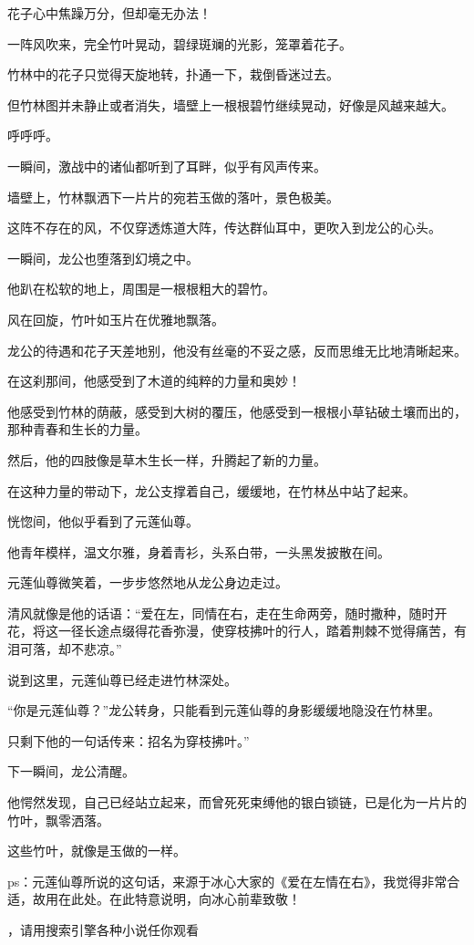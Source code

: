 \begin{this_body}
花子心中焦躁万分，但却毫无办法！

一阵风吹来，完全竹叶晃动，碧绿斑斓的光影，笼罩着花子。

竹林中的花子只觉得天旋地转，扑通一下，栽倒昏迷过去。

但竹林图并未静止或者消失，墙壁上一根根碧竹继续晃动，好像是风越来越大。

呼呼呼。

一瞬间，激战中的诸仙都听到了耳畔，似乎有风声传来。

墙壁上，竹林飘洒下一片片的宛若玉做的落叶，景色极美。

这阵不存在的风，不仅穿透炼道大阵，传达群仙耳中，更吹入到龙公的心头。

一瞬间，龙公也堕落到幻境之中。

他趴在松软的地上，周围是一根根粗大的碧竹。

风在回旋，竹叶如玉片在优雅地飘落。

龙公的待遇和花子天差地别，他没有丝毫的不妥之感，反而思维无比地清晰起来。

在这刹那间，他感受到了木道的纯粹的力量和奥妙！

他感受到竹林的荫蔽，感受到大树的覆压，他感受到一根根小草钻破土壤而出的，那种青春和生长的力量。

然后，他的四肢像是草木生长一样，升腾起了新的力量。

在这种力量的带动下，龙公支撑着自己，缓缓地，在竹林丛中站了起来。

恍惚间，他似乎看到了元莲仙尊。

他青年模样，温文尔雅，身着青衫，头系白带，一头黑发披散在间。

元莲仙尊微笑着，一步步悠然地从龙公身边走过。

清风就像是他的话语：“爱在左，同情在右，走在生命两旁，随时撒种，随时开花，将这一径长途点缀得花香弥漫，使穿枝拂叶的行人，踏着荆棘不觉得痛苦，有泪可落，却不悲凉。”

说到这里，元莲仙尊已经走进竹林深处。

“你是元莲仙尊？”龙公转身，只能看到元莲仙尊的身影缓缓地隐没在竹林里。

只剩下他的一句话传来：招名为穿枝拂叶。”

下一瞬间，龙公清醒。

他愕然发现，自己已经站立起来，而曾死死束缚他的银白锁链，已是化为一片片的竹叶，飘零洒落。

这些竹叶，就像是玉做的一样。

ps：元莲仙尊所说的这句话，来源于冰心大家的《爱在左情在右》，我觉得非常合适，故用在此处。在此特意说明，向冰心前辈致敬！

，请用搜索引擎各种小说任你观看

\end{this_body}

